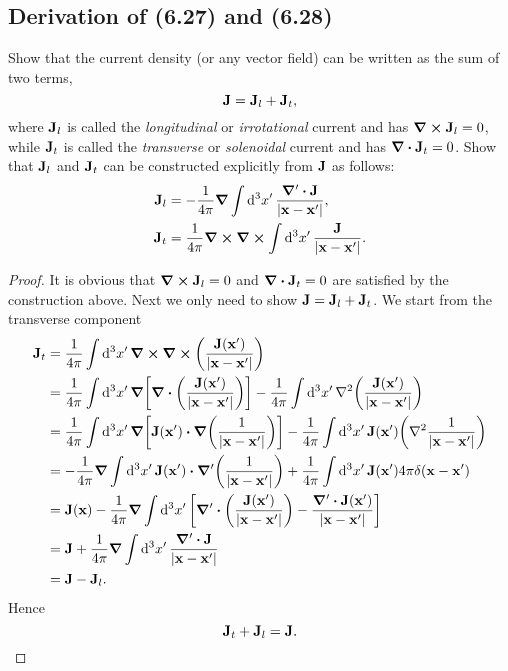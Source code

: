 \documentclass[10pt]{article}
\begin{document}
\subsection{Derivation of (6.27) and (6.28)}
Show that the current density (or any vector field) can be written as the sum of two terms,
\begin{equation}
	\vb{J} = \vb{J}_l + \vb{J}_t,
\end{equation}
where $\vb{J}_l$ is called the \textit{longitudinal} or \textit{irrotational} current and has $\curl{\vb{J}_l} = 0$, while $\vb{J}_t$ is called the \textit{transverse} or \textit{solenoidal} current and has $\div{\vb{J}_t} = 0$. Show that $\vb{J}_l$ and $\vb{J}_t$ can be constructed explicitly from $\vb{J}$ as follows:
\begin{align}
	\vb{J}_l &= -\frac{1}{4\pi} \grad \int \dd[3]{x'} \frac{\grad' \vdot {\vb{J}}}{\abs{\vb{x} - \vb{x'}}}, \\
	\vb{J}_t &= \frac{1}{4\pi} \curl \curl \int \dd[3]{x'} \frac{\vb{J}}{\abs{\vb{x}- \vb{x'}}}.
\end{align}
\begin{proof}
	It is obvious that $\curl{\vb{J}_l} = 0$ and $\div{\vb{J}_t} = 0$ are satisfied by the construction above. Next we only need to show $\vb{J} = \vb{J}_l + \vb{J}_t$. We start from the transverse component
	\begin{align*}
		\vb{J}_t &= \frac{1}{4\pi} \int \dd[3]{x'} \curl \curl \qty(\frac{\vb{J}(\vb{x'})}{\abs{\vb{x}- \vb{x'}}}) \\
		&= \frac{1}{4\pi} \int \dd[3]{x'} \grad \qty[\div(\frac{\vb{J}(\vb{x'})}{\abs{\vb{x}- \vb{x'}}})] - \frac{1}{4\pi} \int \dd[3]{x'} \laplacian \qty(\frac{\vb{J}(\vb{x'})}{\abs{\vb{x}- \vb{x'}}}) \\
		&= \frac{1}{4\pi} \int \dd[3]{x'} \grad \qty[\vb{J}(\vb{x'}) \vdot \grad(\frac{1}{\abs{\vb{x}- \vb{x'}}})] - \frac{1}{4\pi} \int \dd[3]{x'} \vb{J}(\vb{x'}) \qty(\laplacian \frac{1}{\abs{\vb{x}- \vb{x'}}}) \\
		&= - \frac{1}{4\pi} \grad \int \dd[3]{x'}  \vb{J}(\vb{x'}) \vdot \grad'\qty(\frac{1}{\abs{\vb{x}- \vb{x'}}}) + \frac{1}{4\pi} \int \dd[3]{x'} \vb{J}(\vb{x'}) 4\pi \delta(\vb{x} - \vb{x'}) \\
		&= \vb{J}(\vb{x}) - \frac{1}{4\pi} \grad \int \dd[3]{x'} \qty[\grad' \vdot \qty(\frac{\vb{J}(\vb{x'})}{\abs{\vb{x}- \vb{x'}}}) - \frac{\grad' \vdot \vb{J}(\vb{x'})}{\abs{\vb{x}- \vb{x'}}}] \\
		&= \vb{J} + \frac{1}{4\pi} \grad \int \dd[3]{x'} \frac{\grad' \vdot {\vb{J}}}{\abs{\vb{x} - \vb{x'}}} \\
		&= \vb{J} - \vb{J}_l.
	\end{align*}
	Hence
	\begin{equation}
		\vb{J}_t + \vb{J}_l = \vb{J}.
	\end{equation}

\end{proof}
\end{document}
